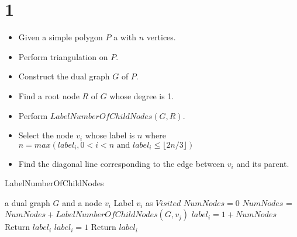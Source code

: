 
\section*{1}
\begin{itemize}
    \item Given a simple polygon $P$ a with $n$ vertices.
    \item Perform triangulation on $P$.
    \item Construct the dual graph $G$ of $P$.
    \item Find a root node $R$ of $G$ whose degree is 1.
    \item Perform $LabelNumberOfChildNodes(G,R)$.
    \item Select the node $v_i$ whose label is $n$ where $n = max(label_i,0<i<n \text{ and } label_i \leq \lfloor 2n/3\rfloor )$
    \item Find the diagonal line corresponding to the edge between $v_i$ and its parent.
\end{itemize}

\begin{algorithm}[h]
  \caption{LabelNumberOfChildNodes}
  \label{alg:LabelNumberOfChildNodes}
  \begin{algorithmic}
      \Require a dual graph $G$ and a node $v_i$
      \State Label $v_i$ as $Visited$
      \State $NumNodes = 0$
      \State $NumNodes$ = $NumNodes + LabelNumberOfChildNodes(G, v_j)$
      \EndIf
      \EndFor
      \State $label_i = 1 + NumNodes$
      \State Return $label_i$
      \Else
      \State $label_i = 1$
      \State Return $label_i$
      \EndIf
\end{algorithmic}
\end{algorithm}
